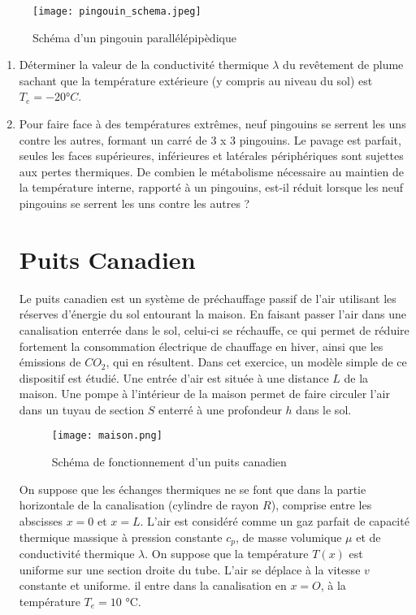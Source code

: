 \documentclass{article}
\begin{document}
\begin{figure}[h]
  \centering
  \texttt{[image: pingouin\_schema.jpeg]}
  \label{fig:maison}
    \caption{Schéma d'un pingouin parallélépipèdique}


\end{figure}
\begin{enumerate}
    \item Déterminer la valeur de la conductivité thermique $\lambda $ du revêtement de plume sachant que
la température extérieure (y compris au niveau du sol) est $T_e = -20$°$C$.
\item Pour faire face à des températures extrêmes, neuf pingouins se serrent les uns contre les
autres, formant un carré de 3 x 3 pingouins. Le pavage est parfait, seules les faces supérieures,
inférieures et latérales périphériques sont sujettes aux pertes thermiques.
De combien le métabolisme nécessaire au maintien de la température interne, rapporté à un
pingouins, est-il réduit lorsque les neuf pingouins se serrent les uns contre les autres ?


\section{Puits Canadien} Le puits canadien est un système de préchauffage passif de l’air utilisant les réserves d’énergie
du sol entourant la maison. En faisant passer l’air dans une canalisation enterrée dans le
sol, celui-ci se réchauffe, ce qui permet de réduire fortement la consommation électrique de
chauffage en hiver, ainsi que les émissions de $CO_2$, qui en résultent. Dans cet exercice, un
modèle simple de ce dispositif est étudié.
Une entrée d'air est située à une distance $L$ de la maison. Une pompe à l’intérieur de la maison
permet de faire circuler l’air dans un tuyau de section $ S$ enterré à une profondeur $h$ dans le
sol. 



\begin{figure}[h]
  \centering
  \texttt{[image: maison.png]}
  \label{fig:maison}
    \caption{Schéma de fonctionnement d'un puits canadien}


\end{figure}


On suppose que les échanges thermiques ne se font que dans la partie horizontale de la canalisation (cylindre de rayon $ R$), comprise entre les abscisses $ x = 0$ et $ x = L$. L’air est considéré comme un gaz parfait de capacité thermique massique à pression constante $c_p$, de masse volumique $\mu$ et de conductivité thermique $\lambda$. On suppose que la température $ T (x)$ est uniforme sur une section droite du tube. L'air se déplace à la vitesse $ v $ constante et uniforme. il entre dans la canalisation  en $ x = O$, à la température $T_e = 10$ °C.


\end{enumerate}
\end{document}
